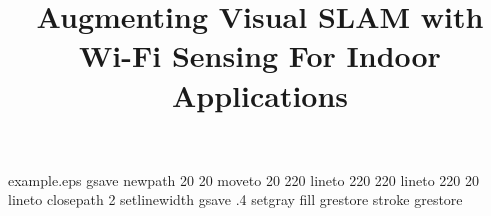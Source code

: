 %
%
%
%
%
\begin{filecontents*}{example.eps}
gsave
newpath
  20 20 moveto
  20 220 lineto
  220 220 lineto
  220 20 lineto
closepath
2 setlinewidth
gsave
  .4 setgray fill
grestore
stroke
grestore
\end{filecontents*}
%
\RequirePackage{fix-cm}
%
\documentclass[twocolumn]{svjour3}          %
%
\smartqed  %
%
\usepackage{graphicx}
\usepackage{apalike}
\usepackage{setspace}
\usepackage{booktabs} %
\usepackage{pdfpages}
\graphicspath{{images/}}
\usepackage{color}
\usepackage{wrapfig}
\usepackage{hyperref}
\usepackage{epstopdf}
\usepackage{subcaption}
\usepackage{array}
\usepackage{balance}
\usepackage{gensymb}
\usepackage{mathpazo}
\usepackage{amsmath}

\newcommand{\zaki}[1] {{\color{red} #1} }
\newcommand{\charu}[1] {{\color{orange} #1} }

%
%
%
%
%


\title{Augmenting Visual SLAM with Wi-Fi Sensing For Indoor Applications%
}


